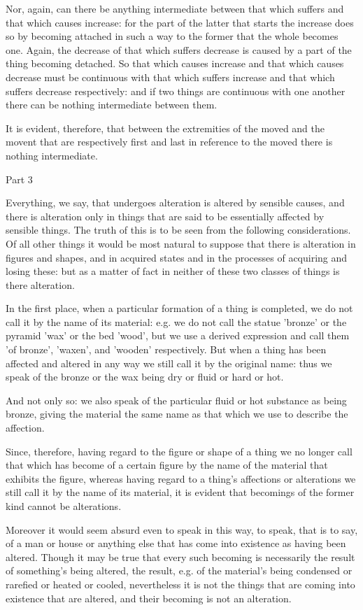 Nor, again, can there be anything intermediate between that which
suffers and that which causes increase: for the part of the latter
that starts the increase does so by becoming attached in such a way
to the former that the whole becomes one. Again, the decrease of that
which suffers decrease is caused by a part of the thing becoming detached.
So that which causes increase and that which causes decrease must
be continuous with that which suffers increase and that which suffers
decrease respectively: and if two things are continuous with one another
there can be nothing intermediate between them. 

It is evident, therefore, that between the extremities of the moved
and the movent that are respectively first and last in reference to
the moved there is nothing intermediate. 

Part 3

Everything, we say, that undergoes alteration is altered by sensible
causes, and there is alteration only in things that are said to be
essentially affected by sensible things. The truth of this is to be
seen from the following considerations. Of all other things it would
be most natural to suppose that there is alteration in figures and
shapes, and in acquired states and in the processes of acquiring and
losing these: but as a matter of fact in neither of these two classes
of things is there alteration. 

In the first place, when a particular formation of a thing is completed,
we do not call it by the name of its material: e.g. we do not call
the statue 'bronze' or the pyramid 'wax' or the bed 'wood', but we
use a derived expression and call them 'of bronze', 'waxen', and 'wooden'
respectively. But when a thing has been affected and altered in any
way we still call it by the original name: thus we speak of the bronze
or the wax being dry or fluid or hard or hot. 

And not only so: we also speak of the particular fluid or hot substance
as being bronze, giving the material the same name as that which we
use to describe the affection. 

Since, therefore, having regard to the figure or shape of a thing
we no longer call that which has become of a certain figure by the
name of the material that exhibits the figure, whereas having regard
to a thing's affections or alterations we still call it by the name
of its material, it is evident that becomings of the former kind cannot
be alterations. 

Moreover it would seem absurd even to speak in this way, to speak,
that is to say, of a man or house or anything else that has come into
existence as having been altered. Though it may be true that every
such becoming is necessarily the result of something's being altered,
the result, e.g. of the material's being condensed or rarefied or
heated or cooled, nevertheless it is not the things that are coming
into existence that are altered, and their becoming is not an alteration.

